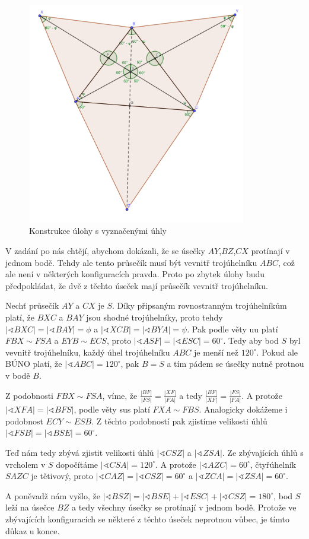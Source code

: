 \documentclass{fkssolpub}
\author{Ondřej Sedláček}
\renewcommand{\angle}{\sphericalangle}
\begin{document}
\begin{figure}
	\begin{center}
		\includegraphics[width=0.85\textwidth]{D-fig}
	\end{center}
	\caption{Konstrukce úlohy s vyznačenými úhly}
	\label{fig:1}
\end{figure}

V zadání po nás chtějí, abychom dokázali, že se úsečky $AY$,$BZ$,$CX$ protínají v jednom bodě. Tehdy ale tento průsečík musí být vevnitř trojúhelníku $ABC$, což ale není v některých konfiguracích pravda. Proto po zbytek úlohy budu předpokládat, že dvě z těchto úseček mají průsečík vevnitř trojúhelníku.

Nechť průsečík $AY$ a $CX$ je $S$. Díky připsaným rovnostranným trojúhelníkům platí, že $BXC$ a $BAY$ jsou shodné trojúhelníky, proto tehdy $|\angle BXC| = |\angle BAY| = \phi$ a $|\angle XCB| = |\angle BYA| = \psi$. Pak podle věty uu platí $FBX \sim FSA$ a $EYB \sim ECS$, proto $|\angle ASF| = |\angle ESC| = 60^{\circ}$. Tedy aby bod $S$ byl vevnitř trojúhelníku, každý úhel trojúhelníku $ABC$ je menší než $120 ^{\circ}$. Pokud ale BÚNO platí, že $|\angle ABC| = 120^{\circ}$, pak $B = S$ a tím pádem se úsečky nutně protnou v bodě $B$.

Z podobnosti $FBX \sim FSA$, víme, že $\frac{|BF|}{|FS|} = \frac{|XF|}{|FA|}$ a tedy $\frac{|BF|}{|XF|} = \frac{|FS|}{|FA|}$. A protože $|\angle XFA| = |\angle BFS|$, podle věty sus platí $FXA \sim FBS$. Analogicky dokážeme i podobnost $ECY \sim ESB$. Z těchto podobností pak zjistíme velikosti úhlů $|\angle FSB| = |\angle BSE| = 60 ^{\circ}$.

Teď nám tedy zbývá zjistit velikosti úhlů $|\angle CSZ|$ a $|\angle ZSA|$. Ze zbývajících úhlů s vrcholem v $S$ dopočítáme $|\angle CSA| = 120^{\circ}$. A protože $|\angle AZC| = 60^{\circ}$, čtyřúhelník $SAZC$ je tětivový, proto $|\angle CAZ| = |\angle CSZ| = 60^{\circ}$ a $|\angle ZCA| = |\angle ZSA| = 60^{\circ}$.

A poněvadž nám vyšlo, že $|\angle BSZ| = |\angle BSE| + |\angle ESC| + |\angle CSZ| = 180^{\circ}$, bod $S$ leží na úsečce $BZ$ a tedy všechny úsečky se protínají v jednom bodě. Protože ve zbývajících konfiguracích se některé z těchto úseček neprotnou vůbec, je tímto důkaz u konce.
\end{document}
